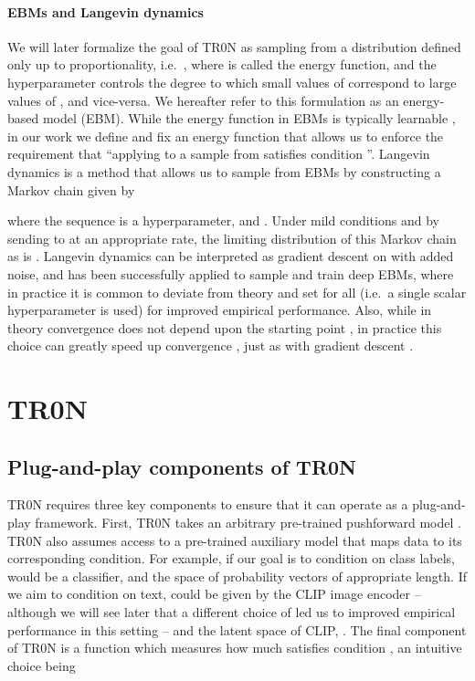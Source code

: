 \documentclass[nohyperref]{article}
\theoremstyle{plain}
\theoremstyle{definition}
\theoremstyle{remark}
\begin{document}
\paragraph{EBMs and Langevin dynamics} We will later formalize the goal of TR0N as sampling from a distribution  defined only up to proportionality, i.e.\ , where  is called the energy function, and the hyperparameter  controls the degree to which small values of  correspond to large values of , and vice-versa. We hereafter refer to this formulation as an energy-based model (EBM). While the energy function in EBMs is typically learnable \citep{xie2016theory,du2019implicit}, in our work we define and fix an energy function that allows us to enforce the requirement that ``applying  to a sample from  satisfies condition ''. 
Langevin dynamics is a method that allows us to sample from EBMs by constructing a Markov chain  given by

where the sequence  is a hyperparameter, and . Under mild conditions and by sending  to  at an appropriate rate, 
the limiting distribution of this Markov chain as  is . 
Langevin dynamics can be interpreted as gradient descent on  with added noise, and has been successfully applied to sample and train deep EBMs, where in practice it is common to deviate from theory and set  for all  (i.e.\ a single scalar hyperparameter  is used) for improved empirical performance. 
Also, while in theory convergence does not depend upon the starting point , in practice this choice can greatly speed up convergence \citep{hinton2002training, nijkamp2020anatomy, yoon2021autoencoding}, just as with gradient descent \citep{boyd2004convex, glorot2010understanding}.
 
\section{TR0N}
\subsection{Plug-and-play components of TR0N}

TR0N requires three key components to ensure that it can operate as a plug-and-play framework. First, TR0N takes an arbitrary pre-trained pushforward model . 
TR0N also assumes access to a pre-trained auxiliary model  that maps data to its corresponding condition. For example, if our goal is to condition on class labels,  would be a classifier, and  the space of probability vectors of appropriate length. If we aim to condition on text,  could be given by the CLIP image encoder  -- although we will see later that a different choice of  led us to improved empirical performance in this setting -- and  the latent space of CLIP, .  
The final component of TR0N is a function  which measures how much  satisfies condition , an intuitive choice being 
\end{document}
